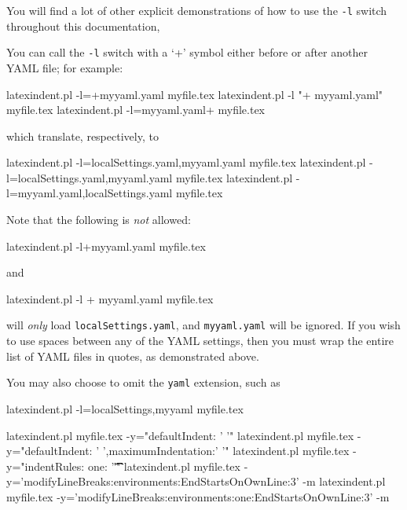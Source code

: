  You will find a lot of other explicit demonstrations of how to use the \texttt{-l}
 switch throughout this documentation,

 You can call the \texttt{-l} switch with a `+' symbol either before or after
  another YAML file; for example:

 \begin{commandshell}
latexindent.pl -l=+myyaml.yaml myfile.tex
latexindent.pl -l "+ myyaml.yaml" myfile.tex
latexindent.pl -l=myyaml.yaml+  myfile.tex
\end{commandshell}

 which translate, respectively, to

 \begin{commandshell}
latexindent.pl -l=localSettings.yaml,myyaml.yaml myfile.tex
latexindent.pl -l=localSettings.yaml,myyaml.yaml myfile.tex
latexindent.pl -l=myyaml.yaml,localSettings.yaml myfile.tex
\end{commandshell}

 Note that the following is \emph{not} allowed:

 \begin{commandshell}
latexindent.pl -l+myyaml.yaml myfile.tex
\end{commandshell}

 and

 \begin{commandshell}
latexindent.pl -l + myyaml.yaml myfile.tex
\end{commandshell}

 will \emph{only} load \texttt{localSettings.yaml}, and \texttt{myyaml.yaml} will be
 ignored. If you wish to use spaces between any of the YAML settings, then you must wrap
 the entire list of YAML files in quotes, as demonstrated above.

 You may also choose to omit the \texttt{yaml} extension, such as

 \begin{commandshell}
latexindent.pl -l=localSettings,myyaml myfile.tex
\end{commandshell}


 \begin{commandshell}
latexindent.pl myfile.tex -y="defaultIndent: ' '"
latexindent.pl myfile.tex -y="defaultIndent: ' ',maximumIndentation:' '"
latexindent.pl myfile.tex -y="indentRules: one: '\t\t\t\t'"
latexindent.pl myfile.tex -y='modifyLineBreaks:environments:EndStartsOnOwnLine:3' -m
latexindent.pl myfile.tex -y='modifyLineBreaks:environments:one:EndStartsOnOwnLine:3' -m
\end{commandshell}

